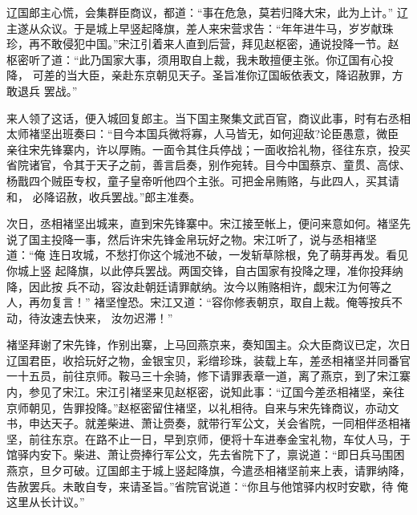 辽国郎主心慌，会集群臣商议，都道：“事在危急，莫若归降大宋，此为上计。”
辽主遂从众议。于是城上早竖起降旗，差人来宋营求告：“年年进牛马，岁岁献珠
珍，再不敢侵犯中国。”宋江引着来人直到后营，拜见赵枢密，通说投降一节。赵
枢密听了道：“此乃国家大事，须用取自上裁，我未敢擅便主张。你辽国有心投降，
可差的当大臣，亲赴东京朝见天子。圣旨准你辽国皈依表文，降诏赦罪，方敢退兵
罢战。”

来人领了这话，便入城回复郎主。当下国主聚集文武百官，商议此事，时有右丞相
太师褚坚出班奏曰：“目今本国兵微将寡，人马皆无，如何迎敌?论臣愚意，微臣
亲往宋先锋寨内，许以厚贿。一面令其住兵停战；一面收拾礼物，径往东京，投买
省院诸官，令其于天子之前，善言启奏，别作宛转。目今中国蔡京、童贯、高俅、
杨戬四个贼臣专权，童子皇帝听他四个主张。可把金帛贿赂，与此四人，买其请和，
必降诏赦，收兵罢战。”郎主准奏。

次日，丞相褚坚出城来，直到宋先锋寨中。宋江接至帐上，便问来意如何。褚坚先
说了国主投降一事，然后许宋先锋金帛玩好之物。宋江听了，说与丞相褚坚道：“俺
连日攻城，不愁打你这个城池不破，一发斩草除根，免了萌芽再发。看见你城上竖
起降旗，以此停兵罢战。两国交锋，自古国家有投降之理，准你投拜纳降，因此按
兵不动，容汝赴朝廷请罪献纳。汝今以贿赂相许，觑宋江为何等之人，再勿复言！”
褚坚惶恐。宋江又道：“容你修表朝京，取自上裁。俺等按兵不动，待汝速去快来，
汝勿迟滞！”

褚坚拜谢了宋先锋，作别出寨，上马回燕京来，奏知国主。众大臣商议已定，次日
辽国君臣，收拾玩好之物，金银宝贝，彩缯珍珠，装载上车，差丞相褚坚并同番官
一十五员，前往京师。鞍马三十余骑，修下请罪表章一道，离了燕京，到了宋江寨
内，参见了宋江。宋江引褚坚来见赵枢密，说知此事：“辽国今差丞相褚坚，亲往
京师朝见，告罪投降。”赵枢密留住褚坚，以礼相待。自来与宋先锋商议，亦动文
书，申达天子。就差柴进、萧让赍奏，就带行军公文，关会省院，一同相伴丞相褚
坚，前往东京。在路不止一日，早到京师，便将十车进奉金宝礼物，车仗人马，于
馆驿内安下。柴进、萧让赍捧行军公文，先去省院下了，禀说道：“即日兵马围困
燕京，旦夕可破。辽国郎主于城上竖起降旗，今遣丞相褚坚前来上表，请罪纳降，
告赦罢兵。未敢自专，来请圣旨。”省院官说道：“你且与他馆驿内权时安歇，待
俺这里从长计议。”

